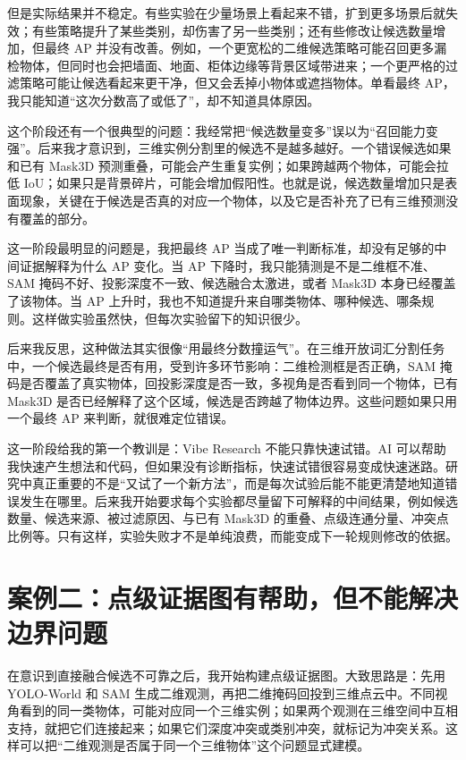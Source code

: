 \documentclass[UTF8,a4paper,12pt]{ctexart}
\begin{document}
但是实际结果并不稳定。有些实验在少量场景上看起来不错，扩到更多场景后就失效；有些策略提升了某些类别，却伤害了另一些类别；还有些修改让候选数量增加，但最终 AP 并没有改善。例如，一个更宽松的二维候选策略可能召回更多漏检物体，但同时也会把墙面、地面、柜体边缘等背景区域带进来；一个更严格的过滤策略可能让候选看起来更干净，但又会丢掉小物体或遮挡物体。单看最终 AP，我只能知道“这次分数高了或低了”，却不知道具体原因。

这个阶段还有一个很典型的问题：我经常把“候选数量变多”误以为“召回能力变强”。后来我才意识到，三维实例分割里的候选不是越多越好。一个错误候选如果和已有 Mask3D 预测重叠，可能会产生重复实例；如果跨越两个物体，可能会拉低 IoU；如果只是背景碎片，可能会增加假阳性。也就是说，候选数量增加只是表面现象，关键在于候选是否真的对应一个物体，以及它是否补充了已有三维预测没有覆盖的部分。

这一阶段最明显的问题是，我把最终 AP 当成了唯一判断标准，却没有足够的中间证据解释为什么 AP 变化。当 AP 下降时，我只能猜测是不是二维框不准、SAM 掩码不好、投影深度不一致、候选融合太激进，或者 Mask3D 本身已经覆盖了该物体。当 AP 上升时，我也不知道提升来自哪类物体、哪种候选、哪条规则。这样做实验虽然快，但每次实验留下的知识很少。

后来我反思，这种做法其实很像“用最终分数撞运气”。在三维开放词汇分割任务中，一个候选最终是否有用，受到许多环节影响：二维检测框是否正确，SAM 掩码是否覆盖了真实物体，回投影深度是否一致，多视角是否看到同一个物体，已有 Mask3D 是否已经解释了这个区域，候选是否跨越了物体边界。这些问题如果只用一个最终 AP 来判断，就很难定位错误。

这一阶段给我的第一个教训是：Vibe Research 不能只靠快速试错。AI 可以帮助我快速产生想法和代码，但如果没有诊断指标，快速试错很容易变成快速迷路。研究中真正重要的不是“又试了一个新方法”，而是每次试验后能不能更清楚地知道错误发生在哪里。后来我开始要求每个实验都尽量留下可解释的中间结果，例如候选数量、候选来源、被过滤原因、与已有 Mask3D 的重叠、点级连通分量、冲突点比例等。只有这样，实验失败才不是单纯浪费，而能变成下一轮规则修改的依据。

\section{案例二：点级证据图有帮助，但不能解决边界问题}

在意识到直接融合候选不可靠之后，我开始构建点级证据图。大致思路是：先用 YOLO-World 和 SAM 生成二维观测，再把二维掩码回投到三维点云中。不同视角看到的同一类物体，可能对应同一个三维实例；如果两个观测在三维空间中互相支持，就把它们连接起来；如果它们深度冲突或类别冲突，就标记为冲突关系。这样可以把“二维观测是否属于同一个三维物体”这个问题显式建模。
\end{document}
